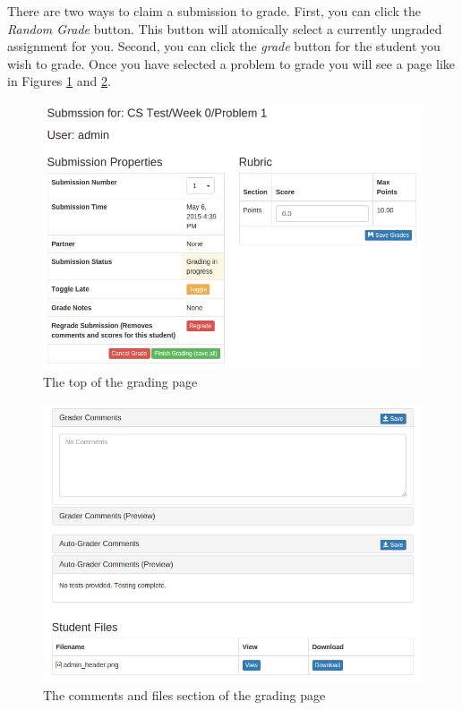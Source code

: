 \documentclass[11pt]{report}
\begin{document}
There are two ways to claim a submission to grade. First, you can click the \emph{Random Grade} button.
This button will atomically select a currently ungraded assignment for you. Second, you can click the
\emph{grade} button for the student you wish to grade. Once you have selected a problem to grade you will
see a page like in Figures \ref{fig:grade_page_top} and \ref{fig:grade_page_bottom}.

\begin{figure}
\centering
\includegraphics[width=\textwidth,height=\textheight,keepaspectratio]{diagrams/grade_top}
\caption{The top of the grading page}
\label{fig:grade_page_top}
\end{figure}

\begin{figure}
\centering
\includegraphics[width=\textwidth,height=\textheight,keepaspectratio]{diagrams/grade_bottom}
\caption{The comments and files section of the grading page}
\label{fig:grade_page_bottom}
\end{figure}
\end{document}
